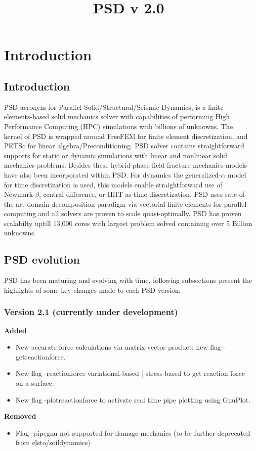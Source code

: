 \documentclass{report}
\title{PSD v 2.0}
\author{}
\begin{document}
\maketitle

\pagebreak
\tableofcontents
\pagebreak
\chapter{Introduction} 

\section{Introduction} 
PSD acronym for Parallel Solid/Structural/Seismic Dynamics, is a finite elements-based solid mechanics solver with capabilities of performing High Performance Computing (HPC) simulations with billions of unknowns. The kernel of PSD is wrapped around FreeFEM for finite element discretization, and PETSc for linear algebra/Preconditioning. PSD solver contains straightforward supports for static or dynamic simulations with linear  and nonlinear solid mechanics problems. Besides these hybrid-phase field fracture mechanics models have also been incorporated within PSD. For dynamics the generalized-$\alpha$ model  for time discretization is used, this models enable straightforward use of Newmark-$\beta$, central difference, or HHT as time discretization. PSD uses sate-of-the art domain-decomposition paradigm via vectorial finite elements for parallel computing and all solvers are  proven to scale quasi-optimally. PSD has proven scalabilty uptill 13,000 cores with largest problem solved containing over 5 Billion unknowns.

\section{PSD evolution}
PSD has been maturing and evolving with time, following subsections present the highlights of  some key changes made to each PSD version. 

\subsection{Version 2.1 (currently under development)}
\textbf{Added}
\begin{itemize}
    \item New accurate force calculations via matrix-vector product: new flag {\ttfamily -getreactionforce}.
    \item New flag {\ttfamily -reactionforce} variational-based | stress-based to get reaction force on a surface.
    \item New flag {\ttfamily -plotreactionforce} to activate real time pipe plotting using GnuPlot. 
\end{itemize}
\textbf{Removed}
\begin{itemize}
    \item Flag {\ttfamily-pipegnu} not supported for damage mechanics (to be further deprecated from elsto/soildynamics) 
\end{itemize}
\end{document}
